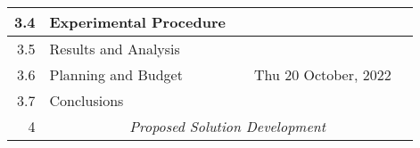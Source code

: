 \documentclass{standalone}
\begin{document}
\begin{tabular}{|r|llll|}
    3.4                                                       & \multicolumn{1}{l|}{Experimental Procedure}                     & \multicolumn{1}{l|}{}                                          & \multicolumn{1}{l|}{}                                       &                                                              \\ \hline
    3.5                                                       & \multicolumn{1}{l|}{Results and Analysis}                       & \multicolumn{1}{l|}{}                                          & \multicolumn{1}{l|}{}                                       &                                                              \\ \hline
    3.6                                                       & \multicolumn{1}{l|}{Planning and Budget}                        & \multicolumn{1}{l|}{}                                          & \multicolumn{1}{l|}{Thu 20 October, 2022}                   &                                                              \\ \hline
    3.7                                                       & \multicolumn{1}{l|}{Conclusions}                                & \multicolumn{1}{l|}{}                                          & \multicolumn{1}{l|}{}                                       &                                                              \\ \hline
    4                                                         & \multicolumn{4}{c|}{\textit{Proposed Solution Development}}                                                                                                                                                                                                   \\ \hline
\end{tabular}
\end{document}

